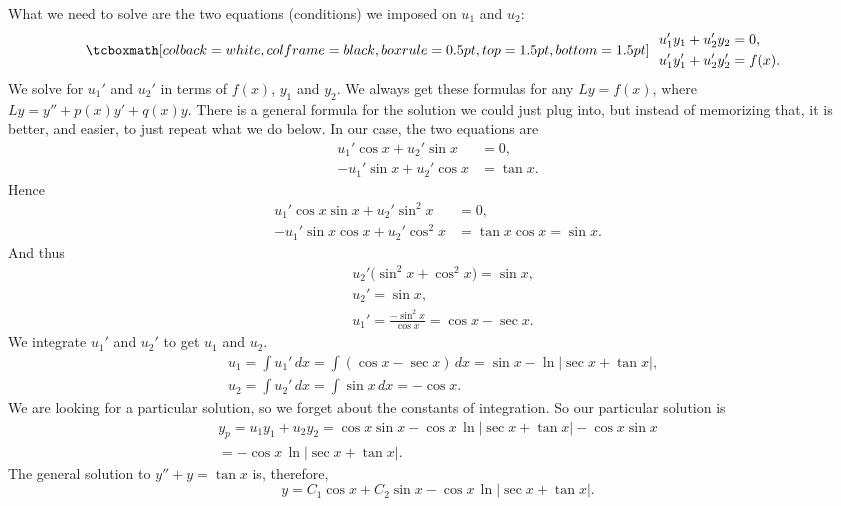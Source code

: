 What we need to solve are the two equations (conditions) we imposed
on $u_1$ and $u_2$:
\begin{equation*}
\mybxbg{~~
\begin{aligned}
& u_1' y_1 + u_2' y_2 = 0 ,\\
& u_1' y_1' + u_2' y_2' = f(x) .
\end{aligned}
~~}
\end{equation*}
We solve for $u_1'$ and $u_2'$ in terms of $f(x)$, $y_1$ and $y_2$.
We always get these formulas for any $Ly = f(x)$, where $Ly =
y''+p(x)y'+q(x)y$.  There is a general
formula for the solution we could just plug into, but instead of memorizing
that, it is better, and easier, to
just repeat what we do below.  In our case, the two equations are
\begin{equation*}
\begin{aligned}
u_1' \cos x + u_2' \sin x &= 0 ,\\
-u_1' \sin x + u_2' \cos x &= \tan x .
\end{aligned}
\end{equation*}
Hence
\begin{equation*}
\begin{aligned}
u_1' \cos x \sin x + u_2' \sin^2 x & = 0 ,\\
-u_1' \sin x \cos x + u_2' \cos^2 x & = \tan x \cos x = \sin x .
\end{aligned}
\end{equation*}
And thus
\begin{equation*}
\begin{aligned}
& u_2' \bigl(\sin^2 x + \cos^2 x\bigr) = \sin x , \\
& u_2' = \sin x , \\
& u_1' = \frac{- \sin^2 x}{\cos x} = \cos x - \sec x .
\end{aligned}
\end{equation*}
We integrate $u_1'$ and $u_2'$ to get $u_1$ and $u_2$.
\begin{equation*}
\begin{aligned}
& u_1 = \int u_1'\,dx 
= \int ( \cos x-\sec x ) \,dx
= \sin x -
\ln \left\lvert \sec x + \tan x \right\rvert
, \\
& u_2 = \int u_2'\,dx 
= \int \sin x\,dx = -\cos x .
\end{aligned}
\end{equation*}
We are looking for a particular solution, so we forget about the constants
of integration.
So our particular solution is
\begin{multline*}
y_p = u_1 y_1 + u_2 y_2 =
\cos x \sin x
-
\cos x
\,
\ln \lvert
\sec x + \tan x
\rvert
-\cos x \sin x
\\ =
-
\cos x \, \ln \lvert
\sec x + \tan x
\rvert .
\end{multline*}
The general solution to $y'' + y = \tan x$ is, therefore,
\begin{equation*}
y = C_1 \cos x + C_2 \sin x
-
\cos x \, \ln \lvert
\sec x + \tan x
\rvert .
\end{equation*}


